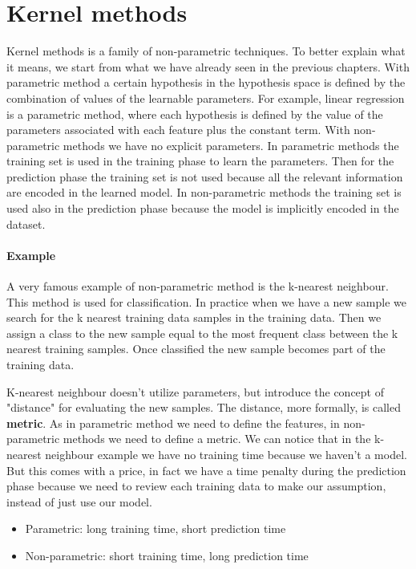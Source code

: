 \documentclass[main.tex]{subfiles}
\begin{document}
\section{Kernel methods}
Kernel methods is a family of non-parametric techniques. To better explain what it means, we start from what we have already seen in the previous chapters. With parametric method a certain hypothesis in the hypothesis space is defined by the combination of values of the learnable parameters. For example, linear regression is a parametric method, where each hypothesis is defined by the value of the parameters associated with each feature plus the constant term.
With non-parametric methods we have no explicit parameters. %
In parametric methods the training set is used in the training phase to learn the parameters. Then for the prediction phase the training set is not used because all the relevant information are encoded in the learned model. In non-parametric methods the training set is used also in the prediction phase because the model is implicitly encoded in the dataset.
\paragraph{Example} A very famous example of non-parametric method is the k-nearest neighbour\footnotemark. This method is used for classification. In practice when we have a new sample we search for the k nearest training data samples in the training data. Then we assign a class to the new sample equal to the most frequent class between the k nearest training samples. Once classified the new sample becomes part of the training data. 

K-nearest neighbour doesn't utilize parameters, but introduce the concept of "distance" for evaluating the new samples. The distance, more formally, is called \textbf{metric}. As in parametric method we need to define the features, in non-parametric methods we need to define a metric. 
We can notice that in the k-nearest neighbour example we have no training time because we haven't a model. But this comes with a price, in fact we have a time penalty during the prediction phase because we need to review each training data to make our assumption, instead of just use our model. 
\begin{itemize}
    \item Parametric: long training time, short prediction time
    \item Non-parametric: short training time, long prediction time
\end{itemize}
\end{document}
